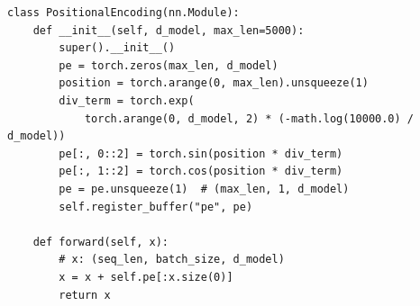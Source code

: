 \begin{listing}
    \begin{verbatim}
class PositionalEncoding(nn.Module):
    def __init__(self, d_model, max_len=5000):
        super().__init__()
        pe = torch.zeros(max_len, d_model)
        position = torch.arange(0, max_len).unsqueeze(1)
        div_term = torch.exp(
            torch.arange(0, d_model, 2) * (-math.log(10000.0) / d_model))
        pe[:, 0::2] = torch.sin(position * div_term)
        pe[:, 1::2] = torch.cos(position * div_term)
        pe = pe.unsqueeze(1)  # (max_len, 1, d_model)
        self.register_buffer("pe", pe)

    def forward(self, x):
        # x: (seq_len, batch_size, d_model)
        x = x + self.pe[:x.size(0)]
        return x
    \end{verbatim}
    \caption{Sinusoidal Positional Encoding}
    \label{lst:positional_encoding}
\end{listing}
